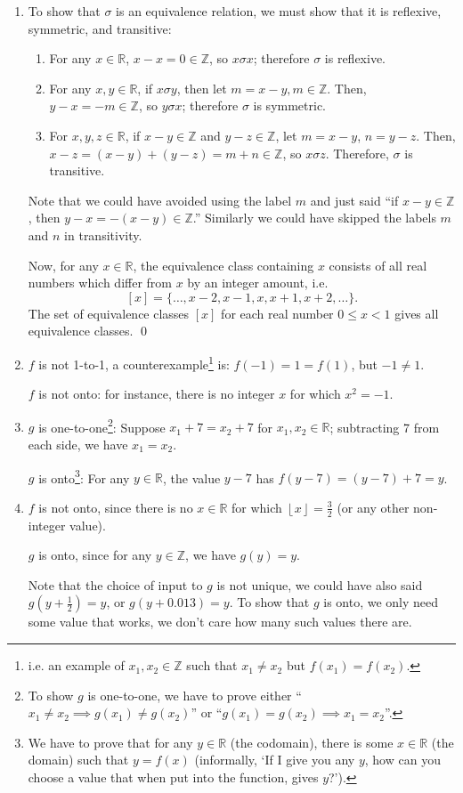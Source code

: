 \documentclass[a4paper,12pt]{article}
\newcommand{\R}{\mathbb{R}}
\newcommand{\Z}{\mathbb{Z}}
\newcommand{\floor}[1]{\left \lfloor #1 \right \rfloor}
\begin{document}
\begin{enumerate}
\item
To show that $\sigma$ is an equivalence relation, we must show that it is
reflexive, symmetric, and transitive:
\begin{enumerate}
\item For any $x \in \R$, $x - x = 0 \in \Z$, so $x \sigma x$; therefore
    $\sigma$ is reflexive.
\item For any $x, y \in \R$, if $x \sigma y$, then let $m = x - y, m \in \Z$.
    Then, $y - x = -m \in \Z$, so $y \sigma x$; therefore $\sigma$ is
    symmetric.
\item For $x, y, z \in \R$, if $x - y \in \Z$ and $y - z \in \Z$, let
    $m = x - y$, $n = y - z$. Then, $x - z = (x - y) + (y - z) = m + n \in \Z$,
    so $x \sigma z$. Therefore, $\sigma$ is transitive.
\end{enumerate}
Note that we could have avoided using the label
$m$ and just said ``if $x - y \in \Z$, then $y-x = -(x-y) \in \Z$.''
Similarly we could have skipped the labels $m$ and $n$ in transitivity.

Now, for any $x \in \R$, the equivalence class containing $x$ consists of
all real numbers which differ from $x$ by an integer amount, i.e.
\[
    [x] = \{\dots, x-2, x-1, x, x+1, x+2, \dots\}.
\]
The set of equivalence classes $[x]$ for each real number $0 \leq x < 1$ gives all
equivalence classes.
\qed

\item
$f$ is not 1-to-1, a counterexample\footnote{i.e. an
example of $x_1, x_2 \in \Z$ such that $x_1 \neq x_2$ but $f(x_1) = f(x_2)$.}
is: $f(-1) = 1 = f(1)$, but $-1 \neq 1$.

$f$ is not onto: for instance, there is no integer $x$ for which $x^2 = -1$.

\item
$g$ is one-to-one\footnote{To show $g$ is one-to-one, we have to prove either
``$x_1 \neq x_2 \implies g(x_1) \neq g(x_2)$'' or
``$g(x_1) = g(x_2) \implies x_1 = x_2$''.}:
Suppose $x_1+7 = x_2+7$ for $x_1, x_2 \in \R$; subtracting 7 from each side,
we have $x_1 = x_2$.

$g$ is onto\footnote{We have to prove that for any $y \in \R$ (the codomain),
there is some $x \in \R$ (the domain)
such that $y = f(x)$ (informally, `If I give you any $y$, how can you
choose a value that when put into the function, gives $y$?').}:
For any $y \in \R$, the value $y-7$ has $f(y-7) = (y-7)+7 = y$.

\item
$f$ is not onto, since there is no $x \in \R$ for which $\floor{x} = \frac{3}{2}$
(or any other non-integer value).

$g$ is onto, since for any $y \in \Z$, we have $g(y) = y$.

Note that the choice of input to $g$ is not unique, we could have also said
$g\left(y+\frac{1}{2}\right) = y$, or $g(y + 0.013) = y$. To show that $g$ is
onto, we only need some value that works, we don't care how many such values
there are.
\end{enumerate}
\end{document}
